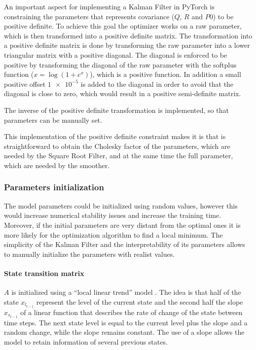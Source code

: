 \documentclass{article}
\begin{document}
An important aspect for implementing a Kalman Filter in PyTorch is constraining the parameters that represents covariance ($Q$, $R$ and $P0$) to be positive definite. To achieve this goal the optimizer works on a raw parameter, which is then transformed into a positive definite matrix.
The transformation into a positive definite matrix is done by transforming the raw parameter into a lower triangular matrix with a positive diagonal. The diagonal is enforced to be positive by transforming the diagonal of the raw parameter with the softplus function ($x = \log (1 + e^{x})$), which is a positive function.
 In addition a small positive offset $\num{1e-5}$ is added to the diagonal in order to avoid that the diagonal is close to zero, which would result in a positive semi-definite matrix.

The inverse of the positive definite transformation is implemented, so that parameters can be manually set.

This implementation of the positive definite constraint makes it is that is straightforward to obtain the Cholesky factor of the parameters, which are needed by the Square Root Filter, and at the same time the full parameter, which are needed by the smoother.

\subsubsection{Parameters initialization}

The model parameters could be initialized using random values, however this would increase numerical stability issues and increase the training time. Moreover, if the initial parameters are very distant from the optimal ones it is more likely for the optimization algorithm to find a local minimum.  The simplicity of the Kalman Filter and the interpretability of its parameters allows to manually initialize the parameters with realist values.

\paragraph{State transition matrix} $A$ is initialized using a ``local linear trend'' model \cite{durbin_time_2012}. The idea is that half of the state $x_{l_{t-1}}$ represent the level of the current state and the second half the slope $x_{s_{t-1}}$ of a linear function that describes the rate of change of the state between time steps. The next state level is equal to the current level plus the slope and a random change, while the slope remains constant. The use of a slope allows the model to retain information of several previous states.
\end{document}
